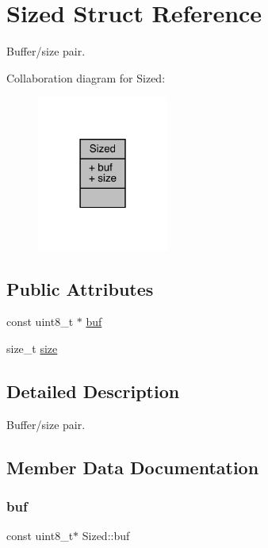 \hypertarget{struct_sized}{}\section{Sized Struct Reference}
\label{struct_sized}


Buffer/size pair.  




Collaboration diagram for Sized\+:\nopagebreak
\begin{figure}[H]
\begin{center}
\leavevmode
\includegraphics[width=122pt]{struct_sized__coll__graph}
\end{center}
\end{figure}
\subsection*{Public Attributes}
\begin{DoxyCompactItemize}
\item 
const uint8\+\_\+t $\ast$ \mbox{\hyperlink{struct_sized_a5513bffc6e24210df9a9bb93554bc556}{buf}}
\item 
size\+\_\+t \mbox{\hyperlink{struct_sized_a12b4432b66bb13986309dd678d3ad4b7}{size}}
\end{DoxyCompactItemize}


\subsection{Detailed Description}
Buffer/size pair. 

\subsection{Member Data Documentation}
\mbox{\label{struct_sized_a5513bffc6e24210df9a9bb93554bc556}} 
\subsubsection{\texorpdfstring{buf}{buf}}
{\footnotesize\ttfamily const uint8\+\_\+t$\ast$ Sized\+::buf}

